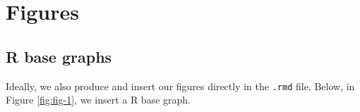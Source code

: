 \documentclass[
  12pt,
]{article}
\newenvironment{Shaded}{\begin{snugshade}}{\end{snugshade}}
\newcommand{\FunctionTok}[1]{\textcolor[rgb]{0.13,0.29,0.53}{\textbf{#1}}}
\newcommand{\NormalTok}[1]{#1}
\newcommand{\SpecialCharTok}[1]{\textcolor[rgb]{0.81,0.36,0.00}{\textbf{#1}}}
\begin{document}
\begin{table}[H]

\caption{\label{tab:tab-3}Table with kable() and kablestyling()}
\centering
{}
\end{table}

\hypertarget{figures}{%
\section{Figures}\label{figures}}

\hypertarget{r-base-graphs}{%
\subsection{R base graphs}\label{r-base-graphs}}

Ideally, we also produce and insert our figures directly in the \texttt{.rmd} file. Below, in Figure \ref{fig:fig-1}, we insert a R base graph.

\begin{Shaded}
\end{Shaded}
\end{document}
